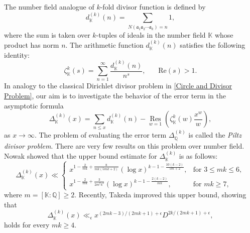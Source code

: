 \documentclass[reqno]{amsart}
\numberwithin{equation}{section}
\theoremstyle{plain}
\begin{document}
The number field analogue of $k$-fold divisor function is defined by 
\begin{equation}
	d_{\mathbb{K}}^{(k)}(n) = \sum_{N(\mathfrak{a}_1 \mathfrak{a}_2 \cdots \mathfrak{a}_k) = n} 1,
\end{equation}
where the sum is taken over $k $-tuples of ideals in the number field $ \mathbb{K}$ whose product has norm $n$. The arithmetic function
$d_{\mathbb{K}}^{(k)}(n)$ satisfies the following identity:
	\begin{equation*}
		\zeta_{\mathbb{K}}^{k}(s) =\sum_{n=1}^{\infty} \frac{d_{\mathbb{K}}^{(k)}(n)}{n^s},  \ \ \ \ \ \ \  \ \text{Re}(s)>1.
	\end{equation*} 
	In analogy to the classical Dirichlet divisor problem in \eqref{Circle and Divisor Problem}, our aim is to investigate the behavior of the error term in the asymptotic formula
	\begin{equation}\label{Asymp of sum d_K}
		\Delta_{\mathbb{K}}^{(k)}(x)=\sum_{n\leq x} d_{\mathbb{K}}^{(k)}(n) - \underset{w=1}{\operatorname{Res}} \left(\zeta_{\mathbb{K}}^k(w)\frac{x^w}{w}\right),
	\end{equation}
	as $x\rightarrow \infty$. The problem of evaluating the error term $\Delta_{\mathbb{Q}}^{(k)}$ is called the \emph{Piltz divisor problem}.  There are very few results on this problem over number field. Nowak \cite{Nowak_1993} showed that the upper bound estimate for $\Delta_{\mathbb{K}}^{(k)}$ is as follows:
\begin{equation*}
	\Delta_{\mathbb{K}}^{(k)}(x) \ll
	\begin{cases}
		x^{1 - \frac{2}{mk} + \frac{8}{mk(5mk + 2)}} (\log x)^{k - 1 - \frac{10(k - 2)}{5m + 2}},
		& \text{for } 3 \leq mk \leq 6, \\
		x^{1 - \frac{2}{mk} + \frac{3}{2m^2k^2}} (\log x)^{k - 1 - \frac{2(k - 2)}{mk}},
		& \text{for } mk \geq 7,
	\end{cases}
\end{equation*}
where $m=[\mathbb{K}: \mathbb{Q}] \geq 2$. Recently, Takeda \cite{Takeda} improved this upper bound, showing  that 
\begin{equation*}
	\Delta_{\mathbb{K}}^{(k)}(x) \ll_{\epsilon} x^{(2mk-3)/(2mk+1)+\epsilon} D^{2k/(2mk+1)+\epsilon},
\end{equation*} holds for every $mk\geq 4$. 
\end{document}

